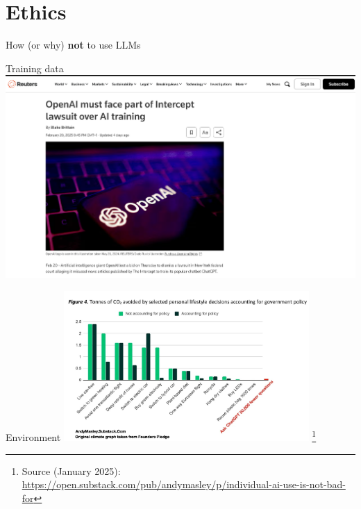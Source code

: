 \documentclass[t,xcolor={dvipsnames},final,aspectratio=169]{beamer}
\begin{document}
\section{Ethics}
\begin{frame}{}
\huge{How (or why) \textbf{not} to use LLMs}
\end{frame}

\begin{frame}{Training data}
\includegraphics[width=\textwidth]{img/trainingdata.png}
\end{frame}

{
\begin{frame}{Environment}
\includegraphics[width=0.7\textwidth]{img/emissions.jpg}
\footnote{Source (January 2025): \url{https://open.substack.com/pub/andymasley/p/individual-ai-use-is-not-bad-for}}
\end{frame}
}
\end{document}
